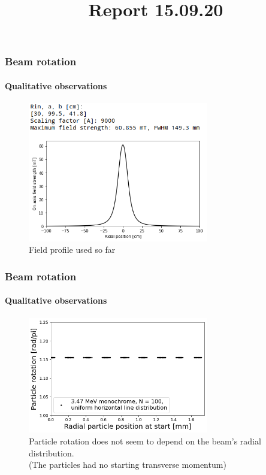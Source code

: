 \documentclass{beamer}
\title{Report 15.09.20}
\begin{document}


\begin{frame}
  \frametitle{Beam rotation}
  \framesubtitle{Qualitative observations}
  \begin{figure}
    \includegraphics[width=0.7\textwidth]{field_101}
    \caption{Field profile used so far}
  \end{figure}
\end{frame}

\begin{frame}
  \frametitle{Beam rotation}
  \framesubtitle{Qualitative observations}
  \begin{figure}
    \includegraphics[width=0.7\textwidth]{rot_line_3.47_mono_100}
    \caption{Particle rotation does not seem to depend on the beam's radial distribution. \\(The particles had no starting transverse momentum)}
  \end{figure}
\end{frame}
\end{document}
